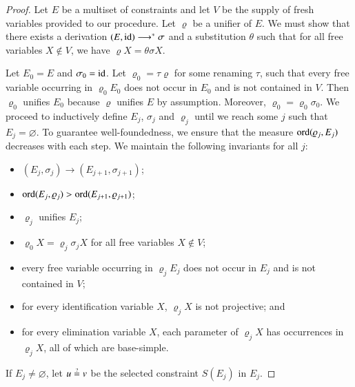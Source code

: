     \begin{proof}
    Let $E$ be a multiset of constraints
    and let $V$ be the supply of fresh variables provided to our procedure. 
    Let $\varrho$ be a unifier of $E$.
    We must show that there exists
    a derivation $(E,\operatorname{id})\longrightarrow^{*}\sigma$ and a
    substitution $\theta$ such that for all free variables $X\not\in V$, we have $\varrho X = \theta\sigma X$.
     

    Let $E_{0}=E$ and $\sigma_{0}=\operatorname{id}$. 
    Let $\varrho_{0}=\tau\varrho$ for some renaming $\tau$, such that 
    every free variable occurring in $\varrho_{0}E_{0}$ does not occur in $E_{0}$ and is not contained in $V$.
    Then $\varrho_{0}$
    unifies $E_{0}$ because $\varrho$ unifies $E$ by assumption.
    Moreover, $\varrho_{0}=\varrho_{0}\sigma_{0}$. We proceed
    to inductively define $E_{j}$, $\sigma_{j}$ and $\varrho_{j}$
    until we reach some $j$ such that $E_j = \varnothing$.
    To guarantee well-foundedness, we ensure that the measure 
    $\operatorname{ord}(\varrho_{j},E_{j})$ decreases with each step.
    We maintain the following invariants for all $j$:
    \begin{itemize}
    \item $(E_{j},\sigma_{j})\longrightarrow(E_{j+1},\sigma_{j+1})$;
    \item $\operatorname{ord}(E_{j},\varrho_{j}) > \operatorname{ord}(E_{j+1}, \varrho_{j+1})$;
    \item $\varrho_{j}$ unifies $E_{j}$;
    \item $\varrho_{0} X = \varrho_{j}\sigma_{j} X$ for all free variables $X\not\in V$;
    \item every free variable occurring in $\varrho_{j}E_{j}$ does not occur in $E_{j}$ and is not contained in $V$;
    \item for every identification variable $X$, $\varrho_j X$ is not projective; and
    \item for every elimination variable $X$, each parameter of $\varrho_j X$ 
          has occurrences in $\varrho_j X$,
          all of which are base-simple.
    \end{itemize}
    If $E_j \not= \varnothing$, let $u\unif v$ be the selected constraint $S(E_{j})$ in $E_{j}$.
    

\end{proof}

